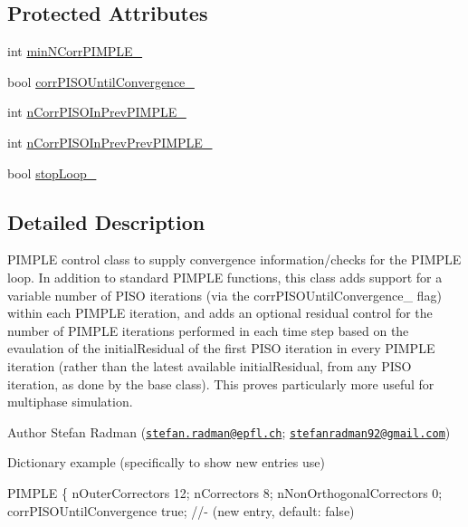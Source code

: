 \subsection*{Protected Attributes}
\begin{DoxyCompactItemize}
\item 
int \hyperlink{classFoam_1_1customPimpleControl_a5a0931848757a28869637ddcecde41ca}{min\+N\+Corr\+P\+I\+M\+P\+L\+E\+\_\+}
\item 
bool \hyperlink{classFoam_1_1customPimpleControl_ac4949cafe879724504a0c546462fbcad}{corr\+P\+I\+S\+O\+Until\+Convergence\+\_\+}
\item 
int \hyperlink{classFoam_1_1customPimpleControl_aa93265414525b6491cd0e7dc461e3aed}{n\+Corr\+P\+I\+S\+O\+In\+Prev\+P\+I\+M\+P\+L\+E\+\_\+}
\item 
int \hyperlink{classFoam_1_1customPimpleControl_a2d598ae5a0cfe7e03ceca9f5b8531026}{n\+Corr\+P\+I\+S\+O\+In\+Prev\+Prev\+P\+I\+M\+P\+L\+E\+\_\+}
\item 
bool \hyperlink{classFoam_1_1customPimpleControl_af4b358156f2ef3f142c5eaf1e4436e50}{stop\+Loop\+\_\+}
\end{DoxyCompactItemize}


\subsection{Detailed Description}
P\+I\+M\+P\+LE control class to supply convergence information/checks for the P\+I\+M\+P\+LE loop. In addition to standard P\+I\+M\+P\+LE functions, this class adds support for a variable number of P\+I\+SO iterations (via the corr\+P\+I\+S\+O\+Until\+Convergence\+\_\+ flag) within each P\+I\+M\+P\+LE iteration, and adds an optional residual control for the number of P\+I\+M\+P\+LE iterations performed in each time step based on the evaulation of the initial\+Residual of the first P\+I\+SO iteration in every P\+I\+M\+P\+LE iteration (rather than the latest available initial\+Residual, from any P\+I\+SO iteration, as done by the base class). This proves particularly more useful for multiphase simulation. 

\label{_Description}%
 Author Stefan Radman (\href{mailto:stefan.radman@epfl.ch}{\tt stefan.\+radman@epfl.\+ch}; \href{mailto:stefanradman92@gmail.com}{\tt stefanradman92@gmail.\+com})

Dictionary example (specifically to show new entries use)

P\+I\+M\+P\+LE \{ n\+Outer\+Correctors 12; n\+Correctors 8; n\+Non\+Orthogonal\+Correctors 0; corr\+P\+I\+S\+O\+Until\+Convergence true; //-\/ (new entry, default\+: false)

